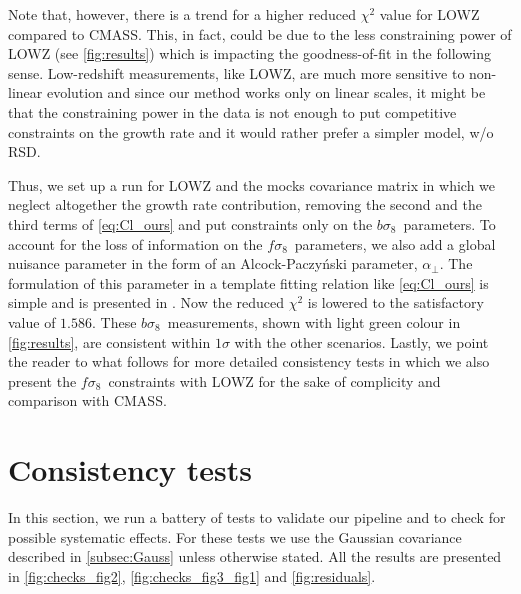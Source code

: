 \documentclass[astrosymb,twocolumn]{aastex631}
\newcommand{\bs}{\ensuremath{b\sigma_8}}
\renewcommand{\fs}{\ensuremath{f\!\sigma_8}}
\begin{document}
Note that, however, there is a trend for a higher reduced $\chi^2$ value for LOWZ compared to CMASS. This, in fact, could be due to the less constraining power of LOWZ (see \autoref{fig:results}) which is impacting the goodness-of-fit in the following sense. Low-redshift measurements, like LOWZ, are much more sensitive to non-linear evolution and since our method works only on linear scales, it might be that the constraining power in the data is not enough to put competitive constraints on the growth rate and it would rather prefer a simpler model, w/o RSD.

Thus, we set up a run for LOWZ and the mocks covariance matrix in which we neglect altogether the growth rate contribution, removing the second and the third terms of \autoref{eq:Cl_ours} and put constraints only on the \bs\ parameters. To account for the loss of information on the \fs\ parameters, we also add a global nuisance parameter in the form of an Alcock-Paczy\'nski parameter, $\alpha_\perp$. The formulation of this parameter in a template fitting relation like \autoref{eq:Cl_ours} is simple and is presented in \cite{Stef22}. Now the reduced \(\chi^2\) is lowered to the satisfactory value of \(1.586\). These \bs\ measurements, shown with light green colour in \autoref{fig:results}, are consistent within $1\sigma$ with the other scenarios. Lastly, we point the reader to what follows for more detailed consistency tests in which we also present the \fs\ constraints with LOWZ for the sake of complicity and comparison with CMASS.



\section{Consistency tests}
\label{appendix}
In this section, we run a battery of tests to validate our pipeline and to check for possible systematic effects. For these tests we use the Gaussian covariance described in \autoref{subsec:Gauss} unless otherwise stated. All the results are presented in \autoref{fig:checks_fig2}, \autoref{fig:checks_fig3_fig1} and \autoref{fig:residuals}.
\end{document}
